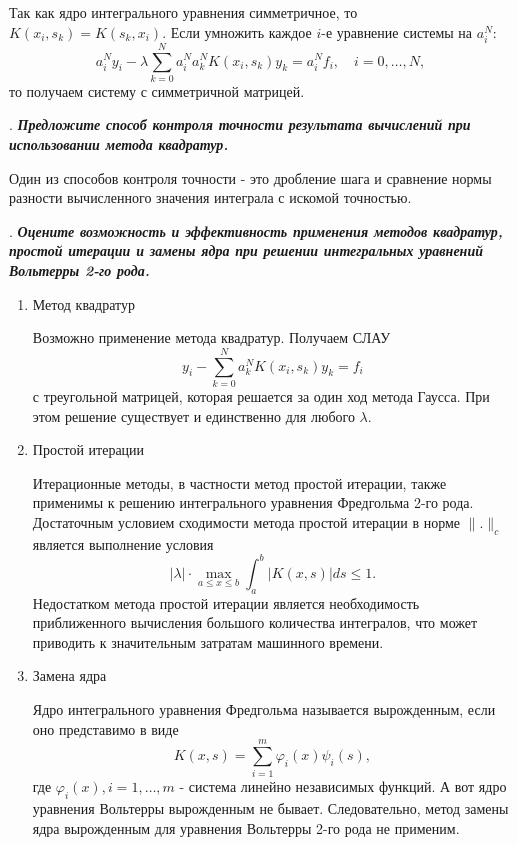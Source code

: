 \documentclass[12pt, a4paper]{article}
\renewcommand{\phi}{\varphi}
\newcounter{mycounter}
\newcommand{\question}[1]{%
	\stepcounter{mycounter}%
	\textbf{\themycounter}.  %
	\textbf{\textit{#1}}
	
}
\begin{document}
	Так как ядро интегрального уравнения симметричное, то $K(x_i, s_k) = K(s_k, x_i)$. Если умножить каждое $i$-е уравнение системы на $a_i^N$:
	\begin{equation}
		a_i^N y_i - \lambda \sum_{k=0}^{N} a_i^N a_k^N K(x_i, s_k) y_k = a_i^N f_i, \quad i = 0, \ldots, N,
	\end{equation}
	то получаем систему с симметричной матрицей.
	
	\bigskip
	\question{Предложите способ контроля точности результата вычислений при использовании метода квадратур.}
	Один из способов контроля точности - это дробление шага и сравнение нормы разности вычисленного значения интеграла с искомой точностью.
	
	\bigskip
	\question{Оцените возможность и эффективность применения методов квадратур, простой итерации и замены ядра при решении интегральных уравнений Вольтерры 2-го рода.}

	\begin{enumerate}
		\item Метод квадратур
		
		 Возможно применение метода квадратур. Получаем СЛАУ
		\[
		y_i - \sum_{k=0}^{N} a_k^N K(x_i, s_k) y_k = f_i
		\]
		с треугольной матрицей, которая решается за один ход метода Гаусса. При этом решение существует и единственно для любого $\lambda$.
		

	
		\item Простой итерации
		
		Итерационные методы, в частности метод простой итерации, также применимы к решению интегрального уравнения Фредгольма 2-го рода. Достаточным условием сходимости метода простой итерации в норме $\|.\|_c$ является выполнение условия
		\[
		|\lambda| \cdot \max_{a \le x \le b} \int_a^b |K(x,s)| ds \le 1.
		\]
		Недостатком метода простой итерации является необходимость приближенного вычисления большого количества интегралов, что может приводить к значительным затратам машинного времени.
		
		
		\item Замена ядра
		
		Ядро интегрального уравнения Фредгольма называется вырожденным, если оно представимо в виде
		\[
		K(x, s) = \sum_{i=1}^{m} \phi_i(x) \psi_i(s),
		\]
		где $\phi_i(x), i = 1, \ldots, m$ - система линейно независимых функций. А вот ядро уравнения Вольтерры вырожденным не бывает. Следовательно, метод замены ядра вырожденным для уравнения Вольтерры 2-го рода не применим.
	\end{enumerate}
	
\end{document}
